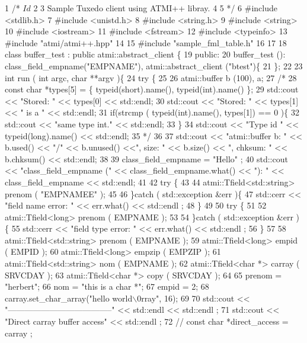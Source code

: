 \begin{DoxyCodeInclude}
1 /* $Id$
2 
3    Sample Tuxedo client using ATMI++ libray.
4 
5  */
6 #include <stdlib.h>
7 #include <unistd.h>
8 #include <string.h>
9 #include <string>
10 #include <iostream>
11 #include <fstream>
12 #include <typeinfo>
13 #include "atmi/atmi++.hpp"
14 
15 #include "sample\_fml\_table.h"
16 
17 
18 class buffer\_test : public atmi::abstract\_client \{
19   public:
20     buffer\_test (): class\_field\_empname("EMPNAME"), atmi::abstract\_client ("btest")\{
21     \};
22 
23     int run ( int argc, char **argv )\{
24       try \{
25 
26         atmi::buffer b (100), a;
27         /*
28            const char *types[5] = \{ typeid(short).name(), typeid(int).name() \};
29            std::cout << "Stored: " << types[0] << std::endl;
30            std::cout << "Stored: " << types[1] << " is a " << std::endl;
31            if(strcmp ( typeid(int).name(), types[1]) == 0 )\{
32            std::cout << "same type int." << std::endl;
33            \}
34            std::cout << "Type id " << typeid(long).name() << std::endl;
35          */
36 
37         std::cout << "atmi::buffer b: " << b.used() << "/" << b.unused() <<", size: " << b.size() << ",
       chksum: " << b.chksum() <<  std::endl;
38 
39         class\_field\_empname = "Hello" ;
40         std::cout << "class\_field\_empname (" << class\_field\_empname.what() << "): " << class\_field\_empname
       << std::endl;
41 
42         try \{
43 
44           atmi::Tfield<std::string> prenom ( "EMPNAMEE" );
45 
46         \}catch ( std::exception &err )\{
47           std::cerr << "field name error: " << err.what() << std::endl ;
48         \}
49 
50         try \{
51 
52           atmi::Tfield<long> prenom ( EMPNAME );
53 
54         \}catch ( std::exception &err )\{
55           std::cerr << "field type error: " << err.what() << std::endl ;
56         \}
57 
58         atmi::Tfield<std::string> prenom ( EMPNAME );
59         atmi::Tfield<long>   empid ( EMPID );
60         atmi::Tfield<long>   empzip ( EMPZIP );
61         atmi::Tfield<std::string> nom ( EMPNAME );
62         atmi::Tfield<char *> carray ( SRVCDAY );
63         atmi::Tfield<char *> copy ( SRVCDAY );
64 
65         prenom = "herbert";
66         nom = "this is a char *";
67         empid = 2;
68         carray.set\_char\_array("hello world\(\backslash\)0rray", 16);
69 
70         std::cout << "--------------------------------------" << std::endl << std::endl ;
71         std::cout << "Direct carray buffer access" << std::endl ;
72         // const char *direct\_access = carray ;

\end{DoxyCodeInclude}
